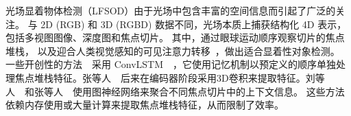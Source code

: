 
\label{chap:part3}
%
%
光场显着物体检测（LFSOD）由于光场中包含丰富的空间信息而引起了广泛的关注。
与 2D (RGB) 和 3D (RGBD) 数据不同，光场本质上捕获结构化 4D 表示，包括多视图图像、深度图和焦点切片。 其中，通过眼球运动顺序观察切片的焦点堆栈，
以及迎合人类视觉感知的可见注意力转移~\cite{piao2020dut}，做出适合显着性对象检测。
%
%
%
%
%
%
%
%
%
%
一些开创性的方法~\cite{zhang2019memory,piao2020exploit}~采用 ConvLSTM~\cite{shi2015convolutional}~，它使用记忆机制以预定义的顺序单独处理焦点堆栈特征。张等人~\cite{zhang2021learning}~后来在编码器阶段采用3D卷积来提取特征。刘等人~\cite{liu2021light}~和张等人~\cite{zhang2021geometry}~使用图神经网络来聚合不同焦点切片中的上下文信息。 这些方法依赖内存使用或大量计算来提取焦点堆栈特征，从而限制了效率。
%
%
%
%
\par
%
%

